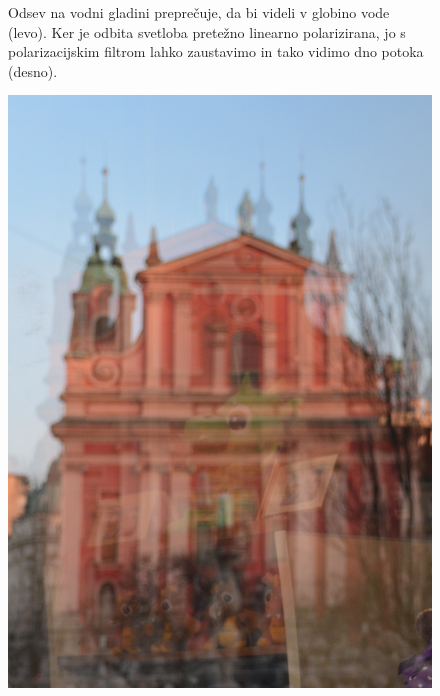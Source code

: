 \begin{remark}
\begin{figure}[ht]
\caption{Odsev na vodni gladini preprečuje, da bi videli v globino vode (levo).
Ker je odbita svetloba pretežno linearno polarizirana, jo s polarizacijskim 
filtrom lahko zaustavimo in tako vidimo dno potoka (desno).}
\label{fig:04_odsevvoda}
\end{figure}

\begin{figure}[ht]
\centering
\includegraphics[width=6truecm]{slike/04_photos_zmaj2.jpg}\qquad \qquad

\end{figure}
\end{remark}
